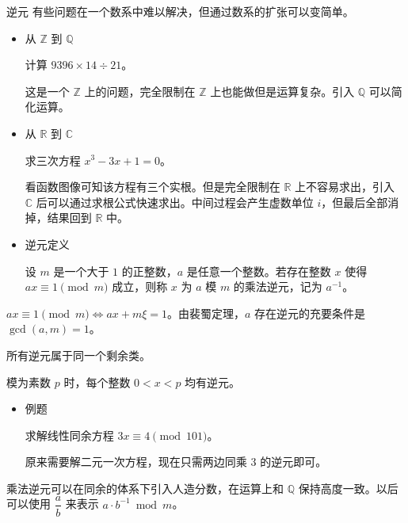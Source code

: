 \documentclass [hyperref={bookmarksdepth=4}, aspectratio=169] {beamer}
\theoremstyle {fy}
\def\Z{\mathbb{Z}}
\def\R{\mathbb{R}}
\def\Q{\mathbb{Q}}
\def\C{\mathbb{C}}
\begin{document}
\begin{frame}{逆元}
有些问题在一个数系中难以解决，但通过数系的扩张可以变简单。

\begin{itemize}
    \item 从 $\Z$ 到  $\Q$

  计算 $9396\times 14\div 21$。

  这是一个 $\Z$ 上的问题，完全限制在 $\Z$ 上也能做但是运算复杂。引入 $\Q$ 可以简化运算。

    \item 从 $\R$ 到 $\C$

  求三次方程 $x^3-3x+1=0$。

  看函数图像可知该方程有三个实根。但是完全限制在 $\R$ 上不容易求出，引入 $\C$ 后可以通过求根公式快速求出。中间过程会产生虚数单位 $i$，但最后全部消掉，结果回到 $\R$ 中。

    \item 逆元定义

  设 $m$ 是一个大于 $1$ 的正整数，$a$ 是任意一个整数。若存在整数 $x$ 使得 $ax\equiv 1\pmod m$ 成立，则称 $x$ 为 $a$ 模 $m$ 的乘法逆元，记为 $a^{-1}$。
\end{itemize}

$ax\equiv 1\pmod m\iff ax+m\xi=1$。由裴蜀定理，$a$ 存在逆元的充要条件是 $\gcd(a,m)=1$。

所有逆元属于同一个剩余类。

模为素数 $p$ 时，每个整数 $0<x<p$ 均有逆元。

\begin{itemize}
    \item 例题

  求解线性同余方程 $3x\equiv 4\pmod{101}$。

  原来需要解二元一次方程，现在只需两边同乘 $3$ 的逆元即可。
\end{itemize}

乘法逆元可以在同余的体系下引入人造分数，在运算上和 $\Q$ 保持高度一致。以后可以使用 $\dfrac{a}{b}$ 来表示 $a\cdot b^{-1}\bmod m$。
\end{frame}
\end{document}
